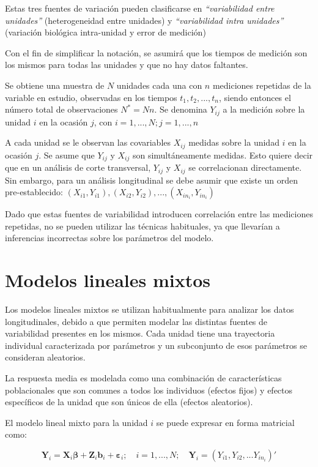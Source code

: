 \documentclass[spanish]{article}
\numberwithin{figure}{subsection}
\numberwithin{equation}{subsection}
\numberwithin{table}{subsection}
\begin{document}
Estas tres fuentes de variación pueden clasificarse en \textit{``variabilidad
entre unidades''} (heterogeneidad entre unidades) y \textit{``variabilidad
intra unidades''} (variación biológica intra-unidad y error de medición)

Con el fin de simplificar la notación, se asumirá que los tiempos de medición
son los mismos para todas las unidades y que no hay datos faltantes.

Se obtiene una muestra de $N$ unidades cada una con $n$ mediciones repetidas de
la variable en estudio, observadas en los tiempos $t_1, t_2, ..., t_n$, siendo
entonces el número total de observaciones $N^*=Nn$. Se denomina $Y_{ij}$ a la
medición sobre la unidad $i$ en la ocasión $j$, con $i=1, ..., N; j=1, ..., n$

A cada unidad se le observan las covariables $X_{ij}$ medidas sobre la unidad $i$
en la ocasión $j$. Se asume que $Y_{ij}$ y $X_{ij}$ son simultáneamente medidas.
Esto quiere decir que en un análisis de corte transversal, $Y_{ij}$ y $X_{ij}$
se correlacionan directamente. Sin embargo, para un análisis longitudinal se
debe asumir que existe un orden pre-establecido: $(X_{i1}, Y_{i1}), (X_{i2},
Y_{i2}), ..., (X_{in_i}, Y_{in_i})$

Dado que estas fuentes de variabilidad introducen correlación entre las
mediciones repetidas, no se pueden utilizar las técnicas habituales, ya que
llevarían a inferencias incorrectas sobre los parámetros del modelo.

\section{Modelos lineales mixtos}

Los modelos lineales mixtos se utilizan habitualmente para analizar los datos
longitudinales, debido a que permiten modelar las distintas fuentes de
variabilidad presentes en los mismos. Cada unidad tiene una trayectoria
individual caracterizada por parámetros y un subconjunto de esos parámetros se
consideran aleatorios.

La respuesta media es modelada como una combinación de características
poblacionales que son comunes a todos los individuos (efectos fijos) y efectos
específicos de la unidad que son únicos de ella (efectos aleatorios).

El modelo lineal mixto para la unidad $i$ se puede expresar en forma matricial
como:

\[
	\bm{Y}_i = \bm{X}_i\bm{\beta} + \bm{Z}_i\bm{b}_i + \bm{\varepsilon}_i;
	\quad i = 1, ..., N;
	\quad \bm{Y}_i = (Y_{i1}, Y_{i2}, ... Y_{in_{i}})'
\]
\end{document}
